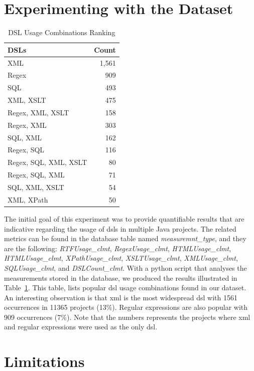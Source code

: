 \documentclass{sig-alternate}
\begin{document}
\section{Experimenting with the Dataset}
\label{sec:dsl}

\begin{table}
\centering
\caption{DSL Usage Combinations Ranking}
\label{tbl:dsl-top-usage}
\begin{tabular}{l r}
 \hline
\textbf{DSLs} & \textbf{Count}\\
\hline
XML & 1,561\\
Regex & 909\\
SQL & 493\\
XML, XSLT & 475\\
Regex, XML, XSLT & 158\\
Regex, XML & 303\\
SQL, XML & 162\\
Regex, SQL & 116\\
Regex, SQL, XML, XSLT & 80\\
Regex, SQL, XML & 71\\
SQL, XML, XSLT & 54\\
XML, XPath & 50\\
\hline
\end{tabular}
\end{table}

The initial goal of this experiment was to provide quantifiable results that are indicative regarding the usage of {\sc dsl}s in multiple Java projects. The related metrics can be found in the database table named \textit{measuremnt\_type}, and they are the following: \textit{RTFUsage\_clmt}, \textit{RegexUsage\_clmt},
\textit{HTMLUsage\_clmt}, \textit{HTMLUsage\_clmt}, \textit{XPathUsage\_clmt}, \textit{XSLTUsage\_clmt}, \textit{XMLUsage\_clmt}, \textit{SQLUsage\_clmt}, and \textit{DSLCount\_clmt}. With a python script that analyses the measurements stored in the database, we produced the results illustrated in Table~\ref{tbl:dsl-top-usage}. This table, lists popular {\sc dsl} usage combinations found in our dataset. An interesting observation is that {\sc xml} is the most widespread {\sc dsl} with 1561 occurrences in 11365 projects (13\%). Regular expressions are also popular with 909 occurrences (7\%). Note that the numbers represents the projects where {\sc xml} and regular expressions were used as the only {\sc dsl}.

\section{Limitations}
\label{sec:limit}
\end{document}
